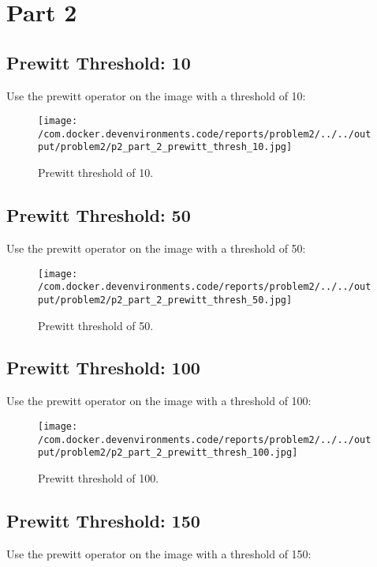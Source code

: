 \documentclass{article}%
\begin{document}
%
\newpage

%
\section{Part 2}%
\label{sec:Part2}%
\subsection{Prewitt Threshold: 10}%
\label{subsec:PrewittThreshold10}%
Use the prewitt operator on the image with a threshold of 10:%


\begin{figure}[h!]%
\centering%
\texttt{[image: /com.docker.devenvironments.code/reports/problem2/../../output/problem2/p2\_part\_2\_prewitt\_thresh\_10.jpg]}%
\caption{Prewitt threshold of 10.}%
\end{figure}

%
\subsection{Prewitt Threshold: 50}%
\label{subsec:PrewittThreshold50}%
Use the prewitt operator on the image with a threshold of 50:%


\begin{figure}[h!]%
\centering%
\texttt{[image: /com.docker.devenvironments.code/reports/problem2/../../output/problem2/p2\_part\_2\_prewitt\_thresh\_50.jpg]}%
\caption{Prewitt threshold of 50.}%
\end{figure}

%
\newpage%
\subsection{Prewitt Threshold: 100}%
\label{subsec:PrewittThreshold100}%
Use the prewitt operator on the image with a threshold of 100:%


\begin{figure}[h!]%
\centering%
\texttt{[image: /com.docker.devenvironments.code/reports/problem2/../../output/problem2/p2\_part\_2\_prewitt\_thresh\_100.jpg]}%
\caption{Prewitt threshold of 100.}%
\end{figure}

%
\subsection{Prewitt Threshold: 150}%
\label{subsec:PrewittThreshold150}%
Use the prewitt operator on the image with a threshold of 150:%
\end{document}
